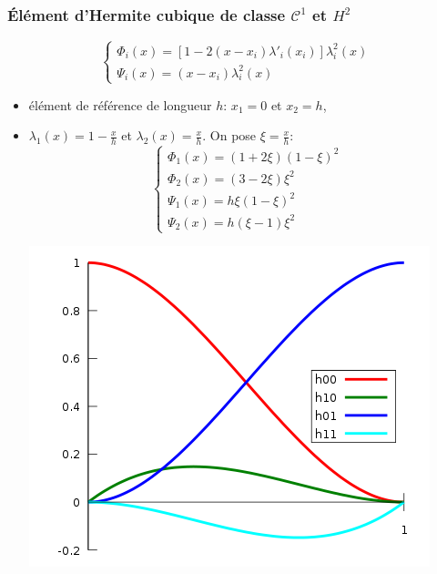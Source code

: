 \documentclass{beamer}
\begin{document}
\begin{frame}
\frametitle{Élément d'Hermite cubique de classe $\mathcal{C}^1$ et $H^2$}
\[\left\{\begin{array}{l}
\Phi_i(x) = \left[1-2(x-x_i)\lambda'_i(x_i)\right]\lambda^2_i(x) \\
\Psi_i(x) = (x-x_i)\lambda^2_i(x) 
\end{array}\right.
 \]
 \begin{itemize}
 \item élément de référence de longueur $h$:  $x_1=0$ et $x_2=h$, 
 \item $\lambda_1(x)=1-\frac{x}{h}$ et $\lambda_2(x)=\frac{x}{h}$. On pose $\xi= \frac{x}{h}$:
 \[\left\{\begin{array}{l}
\Phi_1(x) = (1+2\xi)(1-\xi)^2 \\
\Phi_2(x) = (3-2\xi)\xi^2 \\
\Psi_1(x) = h \xi(1-\xi)^2\\
\Psi_2(x) = h (\xi-1)\xi^2
\end{array}\right.
 \]
 \begin{center}
\includegraphics[scale=0.25]{HermiteBasis.png} 
\end{center}
 \end{itemize}

\end{frame}
\end{document}
